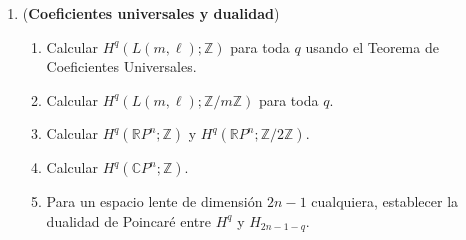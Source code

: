 \documentclass[11pt,a4paper]{article}
\theoremstyle{plain}
\theoremstyle{definition}
\theoremstyle{remark}
\newcommand{\RR}{\mathbb R}
\newcommand{\ZZ}{\mathbb Z}
\newcommand{\CC}{\mathbb C}
\begin{document}
\begin{enumerate}[label=\arabic*.,leftmargin=*]

\item (\textbf{Coeficientes universales y dualidad})
\begin{enumerate}[label=\alph*)]
\item Calcular $H^q(L(m,\ell);\ZZ)$ para toda $q$ usando el Teorema de
Coeficientes Universales.
\item Calcular $H^q(L(m,\ell);\ZZ/m\ZZ)$ para toda $q$.
\item Calcular $H^q(\RR P^n;\ZZ)$ y $H^q(\RR P^n;\ZZ/2\ZZ)$.
\item Calcular $H^q(\CC P^n;\ZZ)$.
\item Para un espacio lente de dimensión $2n-1$ cualquiera, establecer la
dualidad de Poincaré entre $H^q$ y $H_{2n-1-q}$.
\end{enumerate}


\end{enumerate}
\end{document}
